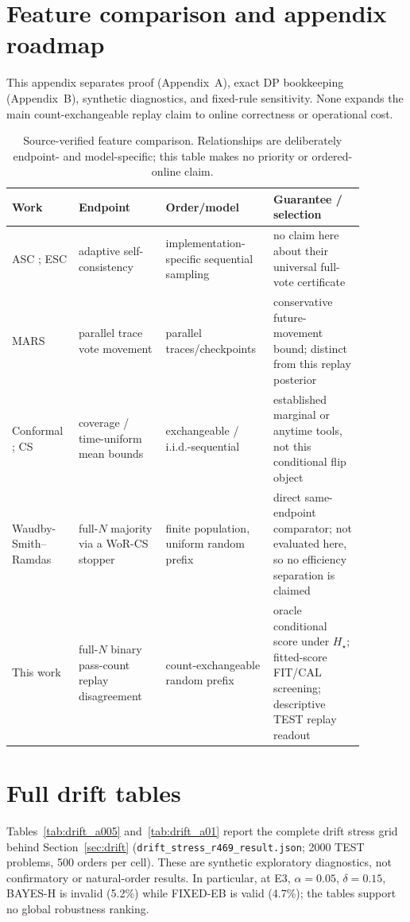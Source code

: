 \documentclass{article}
\theoremstyle{definition}
\theoremstyle{remark}
\newcommand{\trueH}{H_\star}
\begin{document}
\section{Feature comparison and appendix roadmap}
\label{app:positioning}
This appendix separates proof (Appendix~A), exact DP bookkeeping (Appendix~B),
synthetic diagnostics, and fixed-rule sensitivity. None expands the main
count-exchangeable replay claim to online correctness or operational cost.
\begin{table}[h]
\centering\footnotesize\setlength{\tabcolsep}{3pt}
\begin{tabular}{p{0.17\linewidth}p{0.23\linewidth}p{0.24\linewidth}p{0.24\linewidth}}
\toprule
Work & Endpoint & Order/model & Guarantee / selection \\
\midrule
ASC \citep{aggarwal2023asc}; ESC \citep{li2024esc} & adaptive self-consistency & implementation-specific sequential sampling & no claim here about their universal full-vote certificate \\
MARS \citep{chen2026mars} & parallel trace vote movement & parallel traces/checkpoints & conservative future-movement bound; distinct from this replay posterior \\
Conformal \citep{vovk2005algorithmic}; CS \citep{howard2021cs} & coverage / time-uniform mean bounds & exchangeable / i.i.d.-sequential & established marginal or anytime tools, not this conditional flip object \\
Waudby-Smith--Ramdas \citep{WaudbySmithRamdas2020Confidence} & full-$N$ majority via a WoR-CS stopper & finite population, uniform random prefix & direct same-endpoint comparator; not evaluated here, so no efficiency separation is claimed \\
This work & full-$N$ binary pass-count replay disagreement & count-exchangeable random prefix & oracle conditional score under $\trueH$; fitted-score FIT/CAL screening; descriptive TEST replay readout \\
\bottomrule
\end{tabular}
\caption{Source-verified feature comparison. Relationships are deliberately
endpoint- and model-specific; this table makes no priority or ordered-online claim.}
\label{tab:feature-compare}
\end{table}

\section{Full drift tables}
\label{app:drift}
Tables~\ref{tab:drift_a005} and~\ref{tab:drift_a01} report the complete
drift stress grid behind Section~\ref{sec:drift}
(\texttt{drift\_stress\_r469\_result.json}; 2000 TEST problems, 500
orders per cell). These are synthetic exploratory diagnostics, not
confirmatory or natural-order results. In particular, at E3,
$\alpha=0.05$, $\delta=0.15$, BAYES-H is invalid (5.2\%) while FIXED-EB is
valid (4.7\%); the tables support no global robustness ranking.

\end{document}
